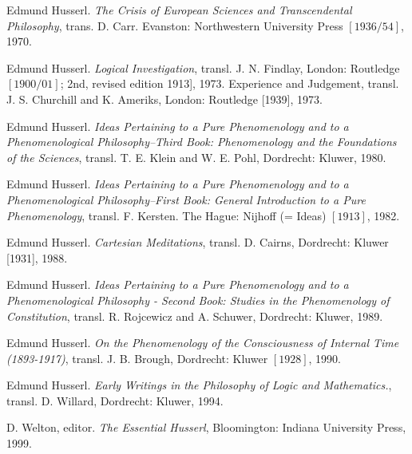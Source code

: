 \documentclass[12pt]{article}
\theoremstyle{plain}
\theoremstyle{definition}
\numberwithin{equation}{section}
\begin{document}
\begin{thebibliography}{99}
Edmund Husserl. {\em The Crisis of European Sciences and Transcendental Philosophy}, trans. D. Carr. Evanston: Northwestern University Press $[1936/54]$, 1970.

Edmund Husserl. {\em Logical Investigation}, transl. J. N. Findlay, London: Routledge $[1900/01]$; 2nd, revised edition 1913], 1973.
Experience and Judgement, transl. J. S. Churchill and K. Ameriks, London: Routledge [1939], 1973.

Edmund Husserl. {\em Ideas Pertaining to a Pure Phenomenology and to a Phenomenological Philosophy--Third Book: Phenomenology and the Foundations of the Sciences}, transl. T. E. Klein and W. E. Pohl, Dordrecht: Kluwer, 1980.

Edmund Husserl. {\em Ideas Pertaining to a Pure Phenomenology and to a Phenomenological Philosophy--First Book: General Introduction to a Pure Phenomenology}, transl. F. Kersten. The Hague: Nijhoff (= Ideas) $[1913]$, 1982.

Edmund Husserl. {\em Cartesian Meditations}, transl. D. Cairns, Dordrecht: Kluwer [1931], 1988.

Edmund Husserl. {\em Ideas Pertaining to a Pure Phenomenology and to a Phenomenological Philosophy - Second Book: Studies in the Phenomenology of Constitution}, transl. R. Rojcewicz and A. Schuwer, Dordrecht: Kluwer, 1989.

Edmund Husserl. {\em On the Phenomenology of the Consciousness of Internal Time (1893-1917)}, transl. J. B. Brough, Dordrecht: Kluwer $[1928]$, 1990.

Edmund Husserl. {\em Early Writings in the Philosophy of Logic and Mathematics.}, transl. D. Willard, Dordrecht: Kluwer, 1994.

D. Welton, editor. {\em The Essential Husserl}, Bloomington: Indiana University Press, 1999.
\end{thebibliography}

\end{document}
